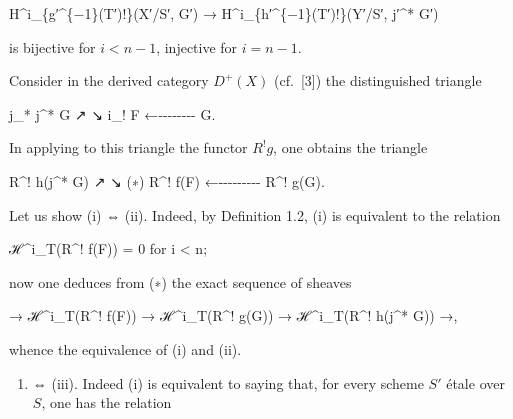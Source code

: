 \documentclass[
]{article}
\newenvironment{Shaded}{}{}
\newcommand{\NormalTok}[1]{#1}
\providecommand{\tightlist}{%
  \setlength{\itemsep}{0pt}\setlength{\parskip}{0pt}}
\begin{document}
\begin{Shaded}
\begin{Highlighting}[]
\NormalTok{H\^{}i\_\{g′\^{}\{−1\}(T′)!\}(X′/S′, G′) → H\^{}i\_\{h′\^{}\{−1\}(T′)!\}(Y′/S′, j′\^{}* G′)}
\end{Highlighting}
\end{Shaded}

is bijective for \(i < n - 1\), injective for \(i = n - 1\).

Consider in the derived category \(D^{+}(X)\) (cf.~{[}3{]}) the
distinguished triangle

\begin{Shaded}
\begin{Highlighting}[]
\NormalTok{        j\_* j\^{}* G}
\NormalTok{       ↗      ↘}
\NormalTok{   i\_! F ←{-}{-}{-}{-}{-}{-}{-}{-} G.}
\end{Highlighting}
\end{Shaded}

In applying to this triangle the functor \(R^{!} g\), one obtains the
triangle

\begin{Shaded}
\begin{Highlighting}[]
\NormalTok{              R\^{}! h(j\^{}* G)}
\NormalTok{             ↗            ↘}
\NormalTok{(∗)    R\^{}! f(F) ←{-}{-}{-}{-}{-}{-}{-}{-}{-} R\^{}! g(G).}
\end{Highlighting}
\end{Shaded}

Let us show (i) ⇔ (ii). Indeed, by Definition 1.2, (i) is equivalent to
the relation

\begin{Shaded}
\begin{Highlighting}[]
\NormalTok{ℋ\^{}i\_T(R\^{}! f(F)) = 0 for i \textless{} n;}
\end{Highlighting}
\end{Shaded}

now one deduces from (∗) the exact sequence of sheaves

\begin{Shaded}
\begin{Highlighting}[]
\NormalTok{→ ℋ\^{}i\_T(R\^{}! f(F)) → ℋ\^{}i\_T(R\^{}! g(G)) → ℋ\^{}i\_T(R\^{}! h(j\^{}* G)) →,}
\end{Highlighting}
\end{Shaded}

whence the equivalence of (i) and (ii).

\begin{enumerate}
\def\labelenumi{(\roman{enumi})}
\tightlist
\item
  ⇔ (iii). Indeed (i) is equivalent to saying that, for every scheme
  \(S'\) étale over \(S\), one has the relation
\end{enumerate}
\end{document}
